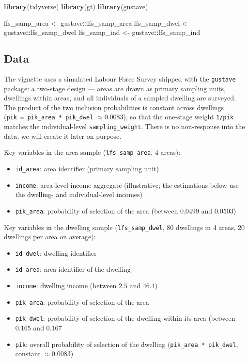 \documentclass[
]{article}
\newenvironment{Shaded}{\begin{snugshade}}{\end{snugshade}}
\newcommand{\FunctionTok}[1]{\textcolor[rgb]{0.13,0.29,0.53}{\textbf{#1}}}
\newcommand{\NormalTok}[1]{#1}
\newcommand{\OtherTok}[1]{\textcolor[rgb]{0.56,0.35,0.01}{#1}}
\newcommand{\SpecialCharTok}[1]{\textcolor[rgb]{0.81,0.36,0.00}{\textbf{#1}}}
\providecommand{\tightlist}{%
  \setlength{\itemsep}{0pt}\setlength{\parskip}{0pt}}
\begin{document}
\begin{Shaded}
\begin{Highlighting}[]
\FunctionTok{library}\NormalTok{(tidyverse)}
\FunctionTok{library}\NormalTok{(gt)}
\FunctionTok{library}\NormalTok{(gustave)}

\NormalTok{lfs\_samp\_area }\OtherTok{\textless{}{-}}\NormalTok{ gustave}\SpecialCharTok{::}\NormalTok{lfs\_samp\_area}
\NormalTok{lfs\_samp\_dwel }\OtherTok{\textless{}{-}}\NormalTok{ gustave}\SpecialCharTok{::}\NormalTok{lfs\_samp\_dwel}
\NormalTok{lfs\_samp\_ind  }\OtherTok{\textless{}{-}}\NormalTok{ gustave}\SpecialCharTok{::}\NormalTok{lfs\_samp\_ind}
\end{Highlighting}
\end{Shaded}

\subsection{Data}\label{data}

The vignette uses a simulated Labour Force Survey shipped with the
\texttt{gustave} package: a two-stage design --- areas are drawn as
primary sampling units, dwellings within areas, and all individuals of a
sampled dwelling are surveyed. The product of the two inclusion
probabilities is constant across dwellings
(\texttt{pik\ =\ pik\_area\ *\ pik\_dwel} \(\approx 0.0083\)), so that
the one-stage weight \texttt{1/pik} matches the individual-level
\texttt{sampling\_weight}. There is no non-response into the data, we
will create it later on purpose.

Key variables in the area sample (\texttt{lfs\_samp\_area}, 4 areas):

\begin{itemize}
\tightlist
\item
  \texttt{id\_area}: area identifier (primary sampling unit)
\item
  \texttt{income}: area-level income aggregate (illustrative; the
  estimations below use the dwelling- and individual-level incomes)
\item
  \texttt{pik\_area}: probability of selection of the area (between
  \(0.0499\) and \(0.0503\))
\end{itemize}

Key variables in the dwelling sample (\texttt{lfs\_samp\_dwel}, 80
dwellings in 4 areas, 20 dwellings per area on average):

\begin{itemize}
\tightlist
\item
  \texttt{id\_dwel}: dwelling identifier
\item
  \texttt{id\_area}: area identifier of the dwelling
\item
  \texttt{income}: dwelling income (between \(2.5\) and \(46.4\))
\item
  \texttt{pik\_area}: probability of selection of the area
\item
  \texttt{pik\_dwel}: probability of selection of the dwelling within
  its area (between \(0.165\) and \(0.167\)
\item
  \texttt{pik}: overall probability of selection of the dwelling
  (\texttt{pik\_area\ *\ pik\_dwel}, constant \(\approx 0.0083\))
\end{itemize}
\end{document}
